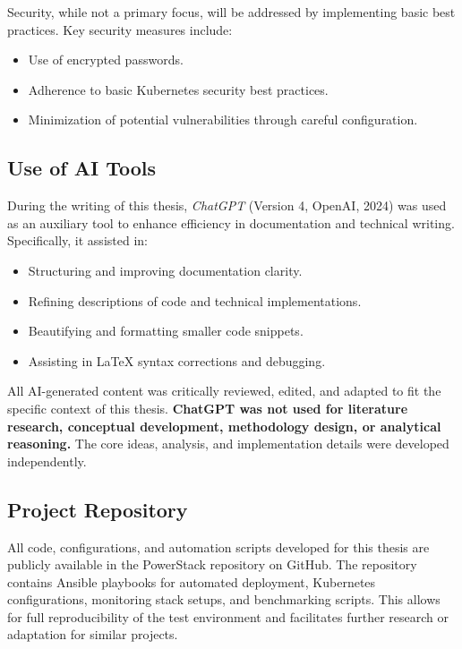 Security, while not a primary focus, will be addressed by implementing basic best practices. Key security measures include:
\begin{itemize}
\item Use of encrypted passwords.
\item Adherence to basic Kubernetes security best practices.
\item Minimization of potential vulnerabilities through careful configuration.
\end{itemize}

\subsection{Use of AI Tools}
During the writing of this thesis, \textit{ChatGPT}\parencite{OpenAI_ChatGPT_2024} (Version 4, OpenAI, 2024) was used as an auxiliary tool to enhance efficiency in documentation and technical writing. Specifically, it assisted in:
\begin{itemize}
\item Structuring and improving documentation clarity.
\item Refining descriptions of code and technical implementations.
\item Beautifying and formatting smaller code snippets.
\item Assisting in LaTeX syntax corrections and debugging.
\end{itemize}
All AI-generated content was critically reviewed, edited, and adapted to fit the specific context of this thesis. \textbf{ChatGPT was not used for literature research, conceptual development, methodology design, or analytical reasoning.} The core ideas, analysis, and implementation details were developed independently.

\subsection {Project Repository}
All code, configurations, and automation scripts developed for this thesis are publicly available in the PowerStack\parencite{PowerStack} repository on GitHub. The repository contains Ansible playbooks for automated deployment, Kubernetes configurations, monitoring stack setups, and benchmarking scripts. This allows for full reproducibility of the test environment and facilitates further research or adaptation for similar projects.
